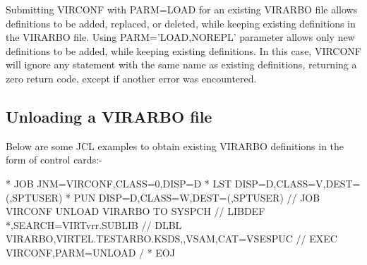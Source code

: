 \documentclass[letterpaper,10pt,english]{sphinxmanual}
\begin{document}

Submitting VIRCONF with PARM=LOAD for an existing VIRARBO file allows definitions to be added, replaced, or deleted, while keeping existing definitions in the VIRARBO file. Using PARM=’LOAD,NOREPL’ parameter allows only new definitions to be added, while keeping existing definitions. In this case, VIRCONF will ignore any statement with the same name as existing definitions, returning a zero return code, except if another error was encountered.


\subsection{Unloading a VIRARBO file}
\label{\detokenize{Installation_Guide:unloading-a-virarbo-file}}\label{\detokenize{Installation_Guide:index-155}}
Below are some JCL examples to obtain existing VIRARBO definitions in the form of control cards:-

\begin{sphinxVerbatim}[commandchars=\\\{\}]
* \PYGZdl{}\PYGZdl{} JOB JNM=VIRCONF,CLASS=0,DISP=D
* \PYGZdl{}\PYGZdl{} LST DISP=D,CLASS=V,DEST=(,SPTUSER)
* \PYGZdl{}\PYGZdl{} PUN DISP=D,CLASS=W,DEST=(,SPTUSER)
// JOB VIRCONF UNLOAD VIRARBO TO SYSPCH
// LIBDEF *,SEARCH=VIRTvrr.SUBLIB
// DLBL VIRARBO,\PYGZsq{}VIRTEL.TESTARBO.KSDS\PYGZsq{},,VSAM,CAT=VSESPUC
// EXEC VIRCONF,PARM=\PYGZsq{}UNLOAD\PYGZsq{}
/\PYGZam{}
* \PYGZdl{}\PYGZdl{} EOJ
\end{sphinxVerbatim}

\end{document}

